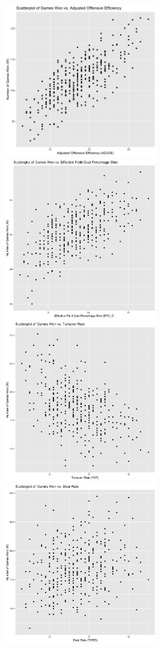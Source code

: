 \documentclass{article}
\begin{document}
\includegraphics[width=0.5\textwidth]{Figures/W_ADJOE.png}\\
\includegraphics[width=0.5\textwidth]{Figures/W_EFGO.png}\\
\includegraphics[width=0.5\textwidth]{Figures/W_TOR.png}\\
\includegraphics[width=0.5\textwidth]{Figures/W_TORD.png}\\
\end{document}
